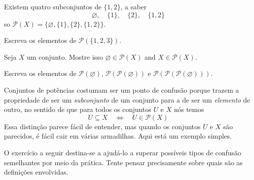 \begin{example}
Existem quatro subconjuntos de $\{ 1, 2 \}$, a saber
\[ \varnothing, \quad \{ 1 \}, \quad \{ 2 \}, \quad \{ 1, 2 \} \]
so $\mathcal{P}(X) = \{\varnothing, \{ 1 \}, \{ 2 \}, \{ 1, 2 \}\}$.
\end{example}

\begin{exercise}
Escreva os elementos de $\mathcal{P}(\{1, 2, 3\})$.
\end{exercise}

\begin{exercise}
Seja $X$ um conjunto. Mostre isso $\varnothing \in \mathcal{P}(X)$ and $X \in \mathcal{P}(X)$.
\end{exercise}

\begin{exercise}
Escreva os elementos de $\mathcal{P}(\varnothing)$, $\mathcal{P}(\mathcal{P}(\varnothing))$ e $\mathcal{P}(\mathcal{P}(\mathcal{P}(\varnothing)))$.
\end{exercise}

Conjuntos de potências costumam ser um ponto de confusão porque trazem a propriedade de ser um \textit{subconjunto} de um conjunto para a de ser um \textit{elemento} de outro, no sentido de que para todos os conjuntos $U$ e $X $ nós temos
\[ U \subseteq X \quad \Leftrightarrow \quad U \in \mathcal{P}(X) \]
Essa distinção parece fácil de entender, mas quando os conjuntos $U$ e $X$ são parecidos, é fácil cair em várias armadilhas. Aqui está um exemplo simples.


O exercício a seguir destina-se a ajudá-lo a superar possíveis tipos de confusão semelhantes por meio da prática. Tente pensar precisamente sobre quais são as definições envolvidas.

